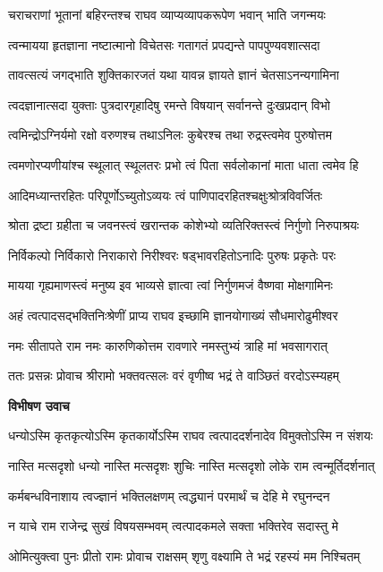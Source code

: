 \twolineshloka
{चराचराणां भूतानां बहिरन्तश्च राघव}
{व्याप्यव्यापकरूपेण भवान् भाति जगन्मयः} %

\twolineshloka
{त्वन्मायया हृतज्ञाना नष्टात्मानो विचेतसः}
{गतागतं प्रपद्यन्ते पापपुण्यवशात्सदा} %

\twolineshloka
{तावत्सत्यं जगद्भाति शुक्तिकारजतं यथा}
{यावन्न ज्ञायते ज्ञानं चेतसाऽनन्यगामिना} %

\twolineshloka
{त्वदज्ञानात्सदा युक्ताः पुत्रदारगृहादिषु}
{रमन्ते विषयान् सर्वानन्ते दुःखप्रदान् विभो} %

\twolineshloka
{त्वमिन्द्रोऽग्निर्यमो रक्षो वरुणश्च तथाऽनिलः}
{कुबेरश्च तथा रुद्रस्त्वमेव पुरुषोत्तम} %

\twolineshloka
{त्वमणोरप्यणीयांश्च स्थूलात् स्थूलतरः प्रभो}
{त्वं पिता सर्वलोकानां माता धाता त्वमेव हि} %

\twolineshloka
{आदिमध्यान्तरहितः परिपूर्णोऽच्युतोऽव्ययः}
{त्वं पाणिपादरहितश्चक्षुःश्रोत्रविवर्जितः} %

\twolineshloka
{श्रोता द्रष्टा ग्रहीता च जवनस्त्वं खरान्तक}
{कोशेभ्यो व्यतिरिक्तस्त्वं निर्गुणो निरुपाश्रयः} %

\twolineshloka
{निर्विकल्पो निर्विकारो निराकारो निरीश्वरः}
{षड्भावरहितोऽनादिः पुरुषः प्रकृतेः परः} %

\twolineshloka
{मायया गृह्यमाणस्त्वं मनुष्य इव भाव्यसे}
{ज्ञात्वा त्वां निर्गुणमजं वैष्णवा मोक्षगामिनः} %

\twolineshloka
{अहं त्वत्पादसद्भक्तिनिःश्रेणीं प्राप्य राघव}
{इच्छामि ज्ञानयोगाख्यं सौधमारोढुमीश्वर} %

\twolineshloka
{नमः सीतापते राम नमः कारुणिकोत्तम}
{रावणारे नमस्तुभ्यं त्राहि मां भवसागरात्} %

\twolineshloka
{ततः प्रसन्नः प्रोवाच श्रीरामो भक्तवत्सलः}
{वरं वृणीष्व भद्रं ते वाञ्छितं वरदोऽस्म्यहम्} %

\textbf{विभीषण उवाच}

\twolineshloka
{धन्योऽस्मि कृतकृत्योऽस्मि कृतकार्योऽस्मि राघव}
{त्वत्पाददर्शनादेव विमुक्तोऽस्मि न संशयः} %

\twolineshloka
{नास्ति मत्सदृशो धन्यो नास्ति मत्सदृशः शुचिः}
{नास्ति मत्सदृशो लोके राम त्वन्मूर्तिदर्शनात्} %

\twolineshloka
{कर्मबन्धविनाशाय त्वज्ज्ञानं भक्तिलक्षणम्}
{त्वद्ध्यानं परमार्थं च देहि मे रघुनन्दन} %

\twolineshloka
{न याचे राम राजेन्द्र सुखं विषयसम्भवम्}
{त्वत्पादकमले सक्ता भक्तिरेव सदास्तु मे} %

\twolineshloka
{ओमित्युक्त्वा पुनः प्रीतो रामः प्रोवाच राक्षसम्}
{शृणु वक्ष्यामि ते भद्रं रहस्यं मम निश्चितम्} %

